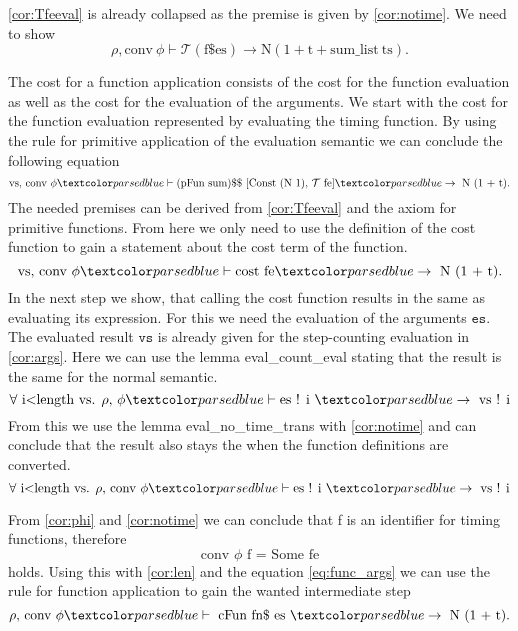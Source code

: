 \ref{cor:Tfeeval} is already collapsed as the premise is given by \ref{cor:notime}.
We need to show
\begin{equation*}
  \rho, \text{conv}\ \phi \vdash\mathcal{T} (\text{f\$ es})\rightarrow \text{N} (1 + \text{t} + \text{sum\_list}\ \text{ts}).
\end{equation*}

The cost for a function application consists of the cost for the function evaluation as well as the cost for the evaluation of the arguments.
We start with the cost for the function evaluation represented by evaluating the timing function.
By using the rule for primitive application of the evaluation semantic we can conclude the following equation
\begin{equation*}
\text{vs, conv } \phi \hvdash \text{(pFun sum)\$\$ } [  \text{Const (N 1), } \mathcal{T}\ \text{fe} ] \hrightarrow \text{ N (1 + t)}.
\end{equation*}
The needed premises can be derived from \ref{cor:Tfeeval} and the axiom for primitive functions. From here we only need to use the definition of the cost function to gain a statement about the cost term of the function.
\begin{equation}
\text{vs, conv } \phi \hvdash \text{cost fe} \hrightarrow \text{ N (1 + t)}.
\end{equation}
In the next step we show, that calling the cost function results in the same as evaluating its expression.
For this we need the evaluation of the arguments $\texttt{es}$.
The evaluated result $\texttt{vs}$ is already given for the step-counting evaluation in \ref{cor:args}.
Here we can use the lemma eval\_count\_eval stating that the result is the same for the normal semantic.
\begin{equation*}
\forall \text{ i<length vs. } \rho \text{, } \phi \hvdash \text{es ! i } \hrightarrow \text{ vs ! i}
\end{equation*}
From this we use the lemma eval\_no\_time\_trans with \ref{cor:notime} and can conclude that the result also stays the when the function definitions are converted.
\begin{equation} \label{eq:func_args}
\forall \text{ i<length vs. } \rho \text{, conv}\ \phi \hvdash \text{es ! i } \hrightarrow \text{ vs ! i}
\end{equation}

From \ref{cor:phi} and \ref{cor:notime} we can conclude that f is an identifier for timing functions, therefore
\begin{equation*}
  \text{conv } \phi \text{ f = Some fe}
\end{equation*}
holds.
Using this with \ref{cor:len} and the equation \ref{eq:func_args} we can use the rule for function application to gain the wanted intermediate step
\begin{equation} \label{eq:func_id}
  \rho \text{, conv }\phi \hvdash \text{ cFun fn\$ es } \hrightarrow \text{ N (1 + t).}
\end{equation}

